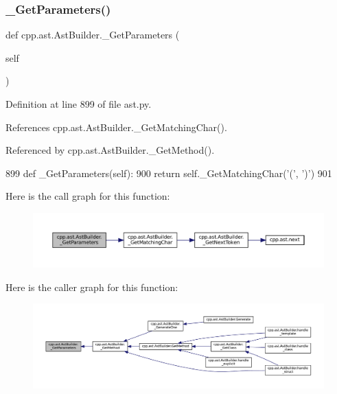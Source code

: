 \subsubsection{\texorpdfstring{\+\_\+\+Get\+Parameters()}{\_GetParameters()}}
{\footnotesize\ttfamily def cpp.\+ast.\+Ast\+Builder.\+\_\+\+Get\+Parameters (\begin{DoxyParamCaption}\item[{}]{self }\end{DoxyParamCaption})\hspace{0.3cm}{\ttfamily [private]}}



Definition at line 899 of file ast.\+py.



References cpp.\+ast.\+Ast\+Builder.\+\_\+\+Get\+Matching\+Char().



Referenced by cpp.\+ast.\+Ast\+Builder.\+\_\+\+Get\+Method().


\begin{DoxyCode}
899     \textcolor{keyword}{def }\_GetParameters(self):
900         \textcolor{keywordflow}{return} self.\_GetMatchingChar(\textcolor{stringliteral}{'('}, \textcolor{stringliteral}{')'})
901 
\end{DoxyCode}
Here is the call graph for this function\+:
\nopagebreak
\begin{figure}[H]
\begin{center}
\leavevmode
\includegraphics[width=350pt]{classcpp_1_1ast_1_1AstBuilder_a89bbfbdcc6d029629f304aa9b643faf3_cgraph}
\end{center}
\end{figure}
Here is the caller graph for this function\+:
\nopagebreak
\begin{figure}[H]
\begin{center}
\leavevmode
\includegraphics[width=350pt]{classcpp_1_1ast_1_1AstBuilder_a89bbfbdcc6d029629f304aa9b643faf3_icgraph}
\end{center}
\end{figure}
\mbox{\label{classcpp_1_1ast_1_1AstBuilder_abef1c7f48a562a67507bd7ed6f822710}} 
